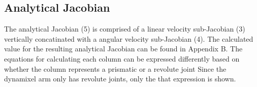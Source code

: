 \documentclass[10pt,journal]{IEEEtran}
\begin{document}
\subsection{Analytical Jacobian}
The analytical Jacobian (5) is comprised of a linear velocity
sub-Jacobian (3) vertically concatinated with a angular velocity
sub-Jacobian (4). The calculated value for the resulting
analytical Jacobian can be found in Appendix B. The equations
for calculating each column can be expressed differently based
on whether the column represents a prismatic or a revolute
joint Since the dynamixel arm only has revolute joints, only
the that expression is shown.

 
 
\end{document}
